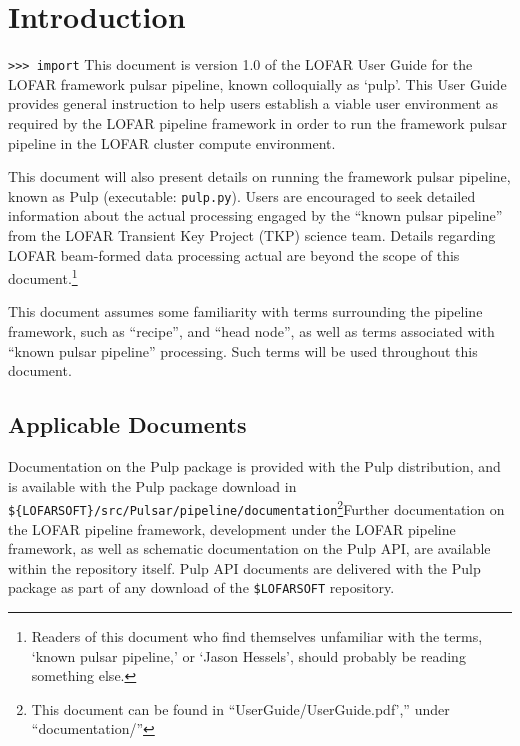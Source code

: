 \documentclass[a4paper,10pt,bibtotoc]{scrartcl}
\begin{document}
\section{Introduction}
\label{sec:introduction}
\verb|>>> import| This document is version 1.0 of the LOFAR User Guide for the LOFAR
framework pulsar pipeline, known colloquially as `pulp'.  This User
Guide provides general instruction to help users establish a viable user environment
as required by the LOFAR pipeline framework in order to run
the framework pulsar pipeline in the LOFAR cluster compute environment.

This document will also present details on running the
framework pulsar pipeline, known as Pulp (executable: \verb|pulp.py|).
Users are encouraged to seek detailed information about the
actual processing engaged by the ``known pulsar pipeline'' from the
LOFAR Transient Key Project (TKP) science team. Details
regarding LOFAR beam-formed data processing actual are beyond the scope of this
document.\footnote{Readers of this
  document who find themselves unfamiliar with the terms, `known pulsar
  pipeline,'  or `Jason Hessels', should probably be reading something else.}

This document assumes some familiarity with terms surrounding the pipeline
framework, such as ``recipe'',  and ``head node'', as well as terms
associated with ``known pulsar pipeline'' processing. Such terms will
be used throughout this document.

\subsection{Applicable Documents}
Documentation on the Pulp package is provided with the Pulp
distribution, and is available with the Pulp package download in
\verb|${LOFARSOFT}/src/Pulsar/pipeline/documentation|\footnote{This
  document can be found in ``UserGuide/UserGuide.pdf','' under ``documentation/''}Further documentation on the LOFAR pipeline framework, development
under the LOFAR pipeline framework,  as well as schematic
documentation on the Pulp API, are available within the repository
itself. Pulp API documents are delivered with the Pulp package as
part of any download of the \verb|$LOFARSOFT| repository.
\end{document}
